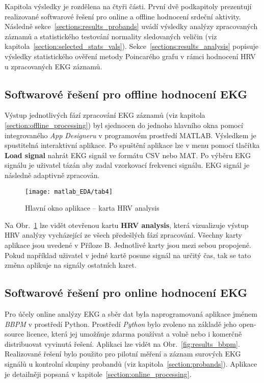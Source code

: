 Kapitola výsledky je rozdělena na čtyři části. První dvě podkapitoly prezentují
realizované softwarové řešení pro online a offline hodnocení srdeční aktivity.
Následně sekce~\ref{sections:results_probands} uvádí výsledky analýzy
zpracovaných záznamů a statistického testování normality sledovaných veličin
(viz kapitola~\ref{section:selected_stats_vals}).
Sekce~\ref{sections:results_analysis} popisuje výsledky statistického ověření
metody Poincarého grafu v rámci hodnocení HRV u zpracovaných EKG záznamů.

\subsection{Softwarové řešení pro offline hodnocení EKG}
\label{sections:results_online}
Výstup jednotlivých fází zpracování EKG záznamů (viz kapitola
\ref{section:offline_processing}) byl sjednocen do jednoho hlavního okna pomocí
integrovaného \textit{App Designeru} \cite{matlabAPPDESIGNER} v programovém
prostředí MATLAB. Výsledkem je spustitelná interaktivní aplikace. Po
spuštění aplikace lze v menu pomocí tlačítka \textbf{Load signal} nahrát EKG
signál ve formátu CSV nebo MAT. Po výběru EKG signálu je uživatel tázán aby
zadal vzorkovací frekvenci signálu. EKG signál je následně adaptivně zpracován.
\begin{figure}[h]
	\begin{center}
		\texttt{[image: matlab\_EDA/tab4]}
		\caption{Hlavní okno aplikace -- karta HRV analysis}
		\label{fig:results_matlab_tab4}
	\end{center}
\end{figure}
Na Obr.~\ref{fig:results_matlab_tab4} lze vidět otevřenou kartu \textbf{HRV
analysis}, která vizualizuje výstup HRV analýzy vycházející ze všech předešlých
fází zpracování. Všechny karty aplikace jsou uvedené v Příloze B. Jednotlivé
karty jsou mezi sebou propojené. Pokud například uživatel v jedné kartě posune
signál na určitý čas, tak se tato změna aplikuje na signály ostatních karet.

\subsection{Softwarové řešení pro online hodnocení EKG}
\label{sections:result_offline}
Pro účely online analýzy EKG a sběr dat byla naprogramovaná aplikace jménem
\textit{BBPM} v prostředí Python. Prostředí \textit{Python} bylo
zvoleno na základě jeho open-source licence, která jej umožňuje zdarma používat
a volně nebo i komerčně distribuovat vyvinutá řešení. Aplikaci lze vidět na
Obr.~\ref{fig:results_bbpm}. Realizované řešení bylo použito pro pilotní měření
a záznam surových EKG signálů u kontrolní skupiny probandů (viz
kapitola~\ref{section:probands}). Aplikace je detailněji popsaná v
kapitole~\ref{section:online_processing}.

